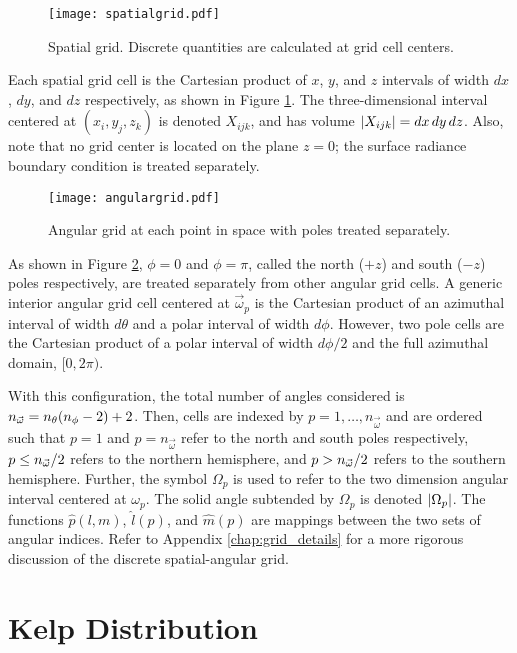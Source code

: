 \begin{figure}[H]
  \centering
  \texttt{[image: spatialgrid.pdf]}
  \caption{Spatial grid. Discrete quantities are calculated at grid cell centers.}
  \label{fig:spatial_grid}
\end{figure}

Each spatial grid cell is the Cartesian product of $x$, $y$, and $z$ intervals of width $dx$, $dy$, and $dz$ respectively,
as shown in Figure \ref{fig:spatial_grid}.
The three-dimensional interval centered at $(x_i, y_j, z_k)$ is denoted $X_{ijk}$, and has volume $\left| X_{ijk} \right|=dx\,dy\,dz$.
Also, note that no grid center is located on the plane $z=0$; the surface radiance boundary condition is treated separately.

\begin{figure}[H]
  \centering
  \texttt{[image: angulargrid.pdf]}
  \caption{Angular grid at each point in space with poles treated separately.}
  \label{fig:angular_grid}
\end{figure}

As shown in Figure \ref{fig:angular_grid}, $\phi=0$ and $\phi=\pi$, called
the north ($+z$) and south ($-z$) poles respectively, are treated separately from other angular grid cells.
A generic interior angular grid cell centered at $\vec{\omega}_p$ is the Cartesian product of an azimuthal interval of width $d\theta$ and a polar interval of width $d\phi$.
However, two pole cells are the Cartesian product of a polar interval of width $d\phi/2$ and the full azimuthal domain, $[0, 2\pi)$.

With this configuration, the total number of angles considered is ${n_{\vec{\omega}}} = n_\theta(n_\phi-2)+2$.
Then, cells are indexed by $p=1,\ldots,n_{\vec{\omega}}$ and are ordered such that
$p=1$ and $p=n_{\vec{\omega}}$ refer to the north and south poles respectively,
$p\leq{n_{\vec{\omega}}}/2$ refers to the northern hemisphere, and $p>{n_{\vec{\omega}}}/2$ refers to the southern hemisphere.
Further, the symbol $\Omega_p$ is used to refer to the two dimension angular interval centered at $\omega_p$.
The solid angle subtended by $\Omega_p$ is denoted $\left| \Omega_p \right|$.
The functions $\hat{p}(l,m)$, $\hat{l}(p)$, and $\hat{m}(p)$ are mappings between the two sets of angular indices.
Refer to Appendix \ref{chap:grid_details} for a more rigorous discussion of the discrete spatial-angular grid.

\section{Kelp Distribution}

